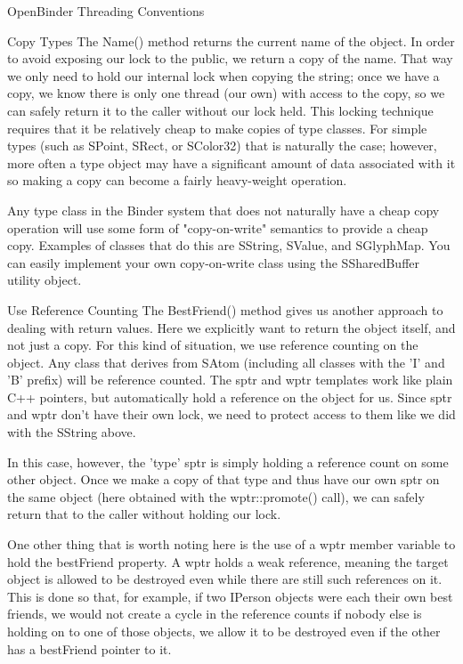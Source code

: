 \documentclass[a4paper,11pt]{article}
\begin{document}
OpenBinder
Threading Conventions


Copy Types
The Name() method returns the current name of the object. In order to avoid exposing our lock to the public, we return a copy of the name. That way we only need to hold our internal lock when copying the string; once we have a copy, we know there is only one thread (our own) with access to the copy, so we can safely return it to the caller without our lock held.
This locking technique requires that it be relatively cheap to make copies of type classes. For simple types (such as SPoint, SRect, or SColor32) that is naturally the case; however, more often a type object may have a significant amount of data associated with it so making a copy can become a fairly heavy-weight operation.

Any type class in the Binder system that does not naturally have a cheap copy operation will use some form of "copy-on-write" semantics to provide a cheap copy. Examples of classes that do this are SString, SValue, and SGlyphMap. You can easily implement your own copy-on-write class using the SSharedBuffer utility object.

Use Reference Counting
The BestFriend() method gives us another approach to dealing with return values. Here we explicitly want to return the object itself, and not just a copy. For this kind of situation, we use reference counting on the object.
Any class that derives from SAtom (including all classes with the 'I' and 'B' prefix) will be reference counted. The sptr and wptr templates work like plain C++ pointers, but automatically hold a reference on the object for us. Since sptr and wptr don't have their own lock, we need to protect access to them like we did with the SString above.

In this case, however, the 'type' sptr is simply holding a reference count on some other object. Once we make a copy of that type and thus have our own sptr on the same object (here obtained with the wptr::promote() call), we can safely return that to the caller without holding our lock.

One other thing that is worth noting here is the use of a wptr member variable to hold the bestFriend property. A wptr holds a weak reference, meaning the target object is allowed to be destroyed even while there are still such references on it. This is done so that, for example, if two IPerson objects were each their own best friends, we would not create a cycle in the reference counts if nobody else is holding on to one of those objects, we allow it to be destroyed even if the other has a bestFriend pointer to it.
\end{document}
